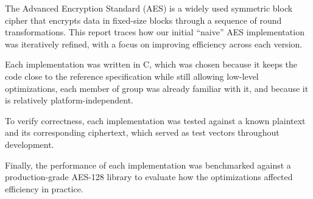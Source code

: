 The Advanced Encryption Standard (AES) is a widely used symmetric block cipher that encrypts data in fixed-size blocks through a sequence of round transformations. This report traces how our initial “naive” AES implementation was iteratively refined, with a focus on improving efficiency across each version.

Each implementation was written in C, which was chosen because it keeps the code close to the reference specification while still allowing low-level optimizations, each member of group was already familiar with it, and because it is relatively platform-independent.

To verify correctness, each implementation was tested against a known plaintext and its corresponding ciphertext, which served as test vectors throughout development. 

Finally, the performance of each implementation was benchmarked against a production-grade AES-128 library to evaluate how the optimizations affected efficiency in practice.
